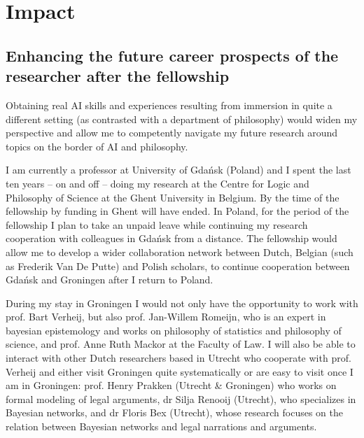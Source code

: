 \documentclass[11pt, a4paper]{article}
\begin{document}
\vspace{-3mm}


\section{Impact}


\vspace{-4mm}



\subsection{Enhancing the future career prospects of the researcher after the fellowship}


\vspace{-3mm}

Obtaining real AI skills and experiences resulting from immersion in quite a different setting (as contrasted with a department of philosophy) would widen my perspective and allow me to competently navigate my future research around topics on the border of AI and philosophy. 

I am currently a professor at University of Gda\' nsk (Poland) and I  spent the last ten years -- on and off -- doing my research at the Centre for Logic and Philosophy of Science at the Ghent University in Belgium. By the time of the fellowship by funding in Ghent will have ended. In Poland, for the period of the fellowship I plan to take an unpaid leave while continuing my   research cooperation with colleagues in Gda\' nsk from a distance. The fellowship would allow me to develop a wider collaboration network between Dutch, Belgian (such as Frederik Van De Putte) and  Polish scholars,  to continue cooperation between Gda\' nsk and Groningen after I return to Poland. 

During my stay in Groningen I would not only have the opportunity to work with prof. Bart Verheij, but also   prof. Jan-Willem Romeijn, who is an expert in bayesian epistemology and  works on philosophy of statistics and philosophy of science, and prof. Anne Ruth Mackor at the Faculty of Law.  I will also be able  to interact with other Dutch researchers based in Utrecht who cooperate with prof. Verheij and either visit Groningen quite systematically or are easy to visit once I am in Groningen: prof. Henry Prakken (Utrecht \& Groningen) who works on formal modeling of legal arguments,  dr Silja Renooij (Utrecht), who specializes in Bayesian networks, and dr Floris Bex (Utrecht), whose research focuses on the relation between Bayesian networks and legal narrations and arguments. 
\end{document}
